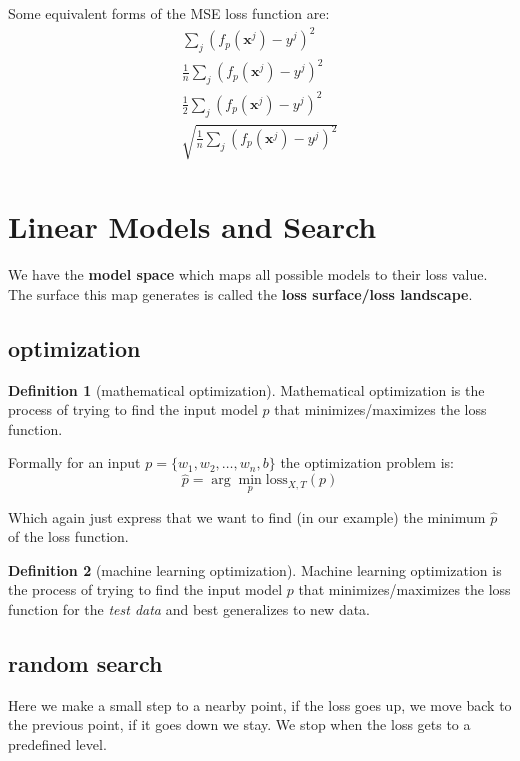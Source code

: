 \documentclass[12pt]{article}
\theoremstyle{definition}
\newtheorem{definition}{Definition}[section]
\begin{document}
Some equivalent forms of the MSE loss function are:
\begin{align*}
    \sum_j (f_p(\mathbf{x}^j) - y^j)^2 \\
    \frac{1}{n}\sum_j (f_p(\mathbf{x}^j) - y^j)^2 \\
    \frac{1}{2}\sum_j (f_p(\mathbf{x}^j) - y^j)^2 \\
    \sqrt{\frac{1}{n}\sum_j (f_p(\mathbf{x}^j) - y^j)^2} \\
\end{align*}

\section{Linear Models and Search}
We have the \textbf{model space} which maps all possible models to their loss value. The surface this map generates is called the \textbf{loss surface/loss landscape}.

\subsection{optimization}

\begin{definition}[mathematical optimization]
    Mathematical optimization is the process of trying to find the input model $p$ that minimizes/maximizes the loss function.
\end{definition}

Formally for an input $p = \{w_1, w_2, \ldots, w_n, b\}$ the optimization problem is:
\begin{equation}
    \hat{p} = \arg\min_{p} \text{loss}_{X, T}(p)
\end{equation}

Which again just express that we want to find (in our example) the minimum $\hat{p}$ of the loss function.

\begin{definition}[machine learning optimization]
    Machine learning optimization is the process of trying to find the input model $p$ that minimizes/maximizes the loss function for the \textit{test data} and best generalizes to new data.
\end{definition}

\subsection{random search}
Here we make a small step to a nearby point, if the loss goes up, we move back to the previous point, if it goes down we stay. We stop when the loss gets to a predefined level.
\end{document}
